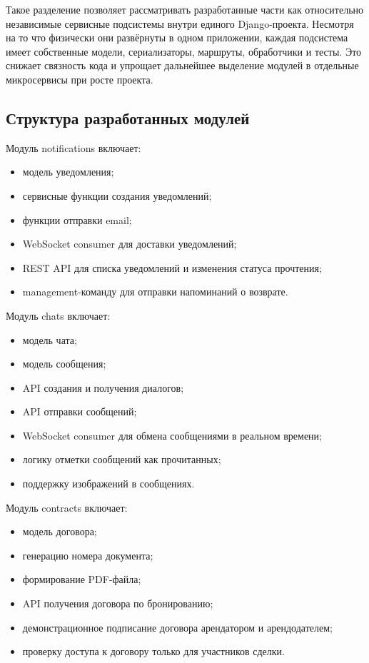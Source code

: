 Такое разделение позволяет рассматривать разработанные части как относительно независимые сервисные подсистемы внутри единого Django-проекта. Несмотря на то что физически они развёрнуты в одном приложении, каждая подсистема имеет собственные модели, сериализаторы, маршруты, обработчики и тесты. Это снижает связность кода и упрощает дальнейшее выделение модулей в отдельные микросервисы при росте проекта.

\subsection{Структура разработанных модулей}
Модуль notifications включает:
\begin{itemize}
\item модель уведомления;
\item сервисные функции создания уведомлений;
\item функции отправки email;
\item WebSocket consumer для доставки уведомлений;
\item REST API для списка уведомлений и изменения статуса прочтения;
\item management-команду для отправки напоминаний о возврате.
\end{itemize}

Модуль chats включает:
\begin{itemize}
\item модель чата;
\item модель сообщения;
\item API создания и получения диалогов;
\item API отправки сообщений;
\item WebSocket consumer для обмена сообщениями в реальном времени;
\item логику отметки сообщений как прочитанных;
\item поддержку изображений в сообщениях.
\end{itemize}

Модуль contracts включает:
\begin{itemize}
\item модель договора;
\item генерацию номера документа;
\item формирование PDF-файла;
\item API получения договора по бронированию;
\item демонстрационное подписание договора арендатором и арендодателем;
\item проверку доступа к договору только для участников сделки.
\end{itemize}


